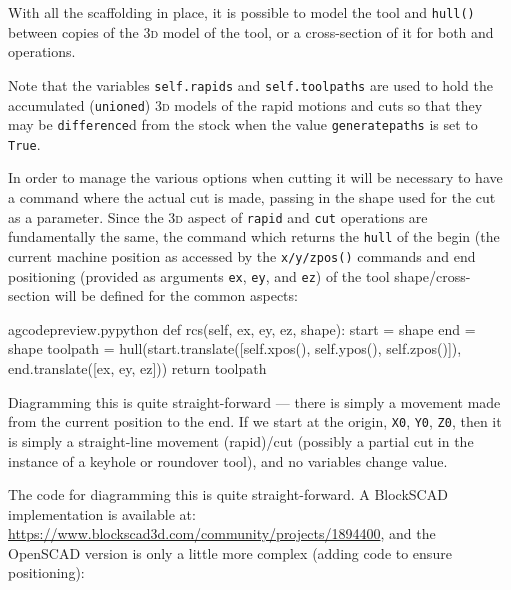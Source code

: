 \documentclass{ltxdoc}
\begin{document}
With all the scaffolding in place, it is possible to model the tool and \verb|hull()| between copies of the \textsc{3d} model of the tool, or a cross-section of it for both  and  operations.


Note that the variables \verb|self.rapids| and \verb|self.toolpaths| are used to hold the accumulated (\verb|unioned|) \textsc{3d} models of the rapid motions and cuts so that they may be \verb|difference|d from the stock when the value \verb|generatepaths| is set to \verb|True|.

In order to manage the various options when cutting it will be necessary to have a command where the actual cut is made, passing in the shape used for the cut as a parameter. Since the \textsc{3d} aspect of \verb|rapid| and \verb|cut| operations are fundamentally the same, the command  which returns the \verb|hull| of the begin (the current machine position as accessed by the \verb|x/y/zpos()| commands and end positioning (provided as arguments \verb|ex|, \verb|ey|, and \verb|ez|) of the tool shape/cross-section will be defined for the common aspects:

\lstset{firstnumber=\thegcpy}
\begin{writecode}{a}{gcodepreview.py}{python}
    def rcs(self, ex, ey, ez, shape):
        start = shape
        end = shape
        toolpath = hull(start.translate([self.xpos(), self.ypos(), self.zpos()]), 
                        end.translate([ex, ey, ez]))
        return toolpath

\end{writecode}
\addtocounter{gcpy}{7}

Diagramming this is quite straight-forward --- there is simply a movement made from the current position to the end. If we start at the origin, \verb|X0|, \verb|Y0|, \verb|Z0|, then it is simply a straight-line movement (rapid)/cut (possibly a partial cut in the instance of a keyhole or roundover tool), and no variables change value.

The code for diagramming this is quite straight-forward. A BlockSCAD implementation is available at: \url{https://www.blockscad3d.com/community/projects/1894400}, and the OpenSCAD version is only a little more complex (adding code to ensure positioning):
\end{document}
